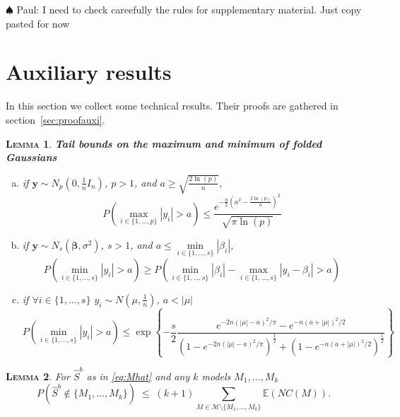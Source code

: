 \documentclass[aos]{imsart}
\theoremstyle{plain}
\newtheorem{lem}{\textsc{Lemma}}[section]
\newcommand{\paul}[1]{{\small{\color{green} \sf $\spadesuit$ Paul: #1}}}
\newcommand{\E}{\mathbb{E}}
\newcommand{\bs}{\boldsymbol}
\begin{document}
\begin{supplement}

\paul{I need to check careefully the rules for supplementary material. Just copy pasted for now}

 
 \section{Auxiliary results}\label{auxiliary}

In this section we collect some technical results. Their proofs are gathered in section~\ref{sec:proofauxi}. 

\begin{lem}\label{lemma:3tailbounds}\textbf{Tail bounds on the maximum and minimum of folded Gaussians} 
\begin{enumerate}[a)]
    \item if $\bs y\sim N_p\left(0,\frac{1}{n}I_n \right)$, $p>1$, and $a \geq \sqrt{\frac{2\ln(p)}{n}}$, $$P\left(\underset{i\in\{1,\ldots,p\}}{\max}|y_i|> a \right) \leq \frac{e^{-\frac{n}{2}\left(a^2-\frac{2\ln (p)}{n}\right)^{2}}}{\sqrt{\pi\ln (p)}}$$
    \item if $\bs y\sim N_s\left(\bs\beta,\sigma^2\right)$, $s>1$, and $a \leq \underset{i\in\{1,\ldots,s\}}{\min}|\beta_i|$,
        $$P\left(\underset{i\in\{1,\ldots,s\}}{\min}|y_i| > a\right) \geq P\left(\underset{i\in\{1,\ldots,s\}}{\min}|\beta_i|-\underset{i\in\{1,\ldots,s\}}{\max}|y_i-\beta_i| > a \right)$$
    \item if $\forall i\in\{1,\ldots,s\}$ $y_i\sim N\left(\mu,\frac{1}{n}\right)$, $a<|\mu|$
        $$P\left(\underset{i\in\{1,\ldots,s\}}{\min}|y_i| > a \right) \leq \exp\left\{-\frac{s}{2}\frac{e^{-2n(|\mu|-a)^2/\pi}-e^{-n(a+|\mu|)^2/2}}{\left(1-e^{-2n(|\mu|-a)^2/\pi}\right)^{\frac{1}{2}}+\left(1-e^{-n(a+|\mu|)^2/2}\right)^{\frac{1}{2}}}\right\} $$
\end{enumerate}
\end{lem}



\begin{lem}\label{lem:L0toL1convergencegen} For $\hat S^b$ as in \eqref{eq:Mhat} and any $k$ models $M_1,\ldots,M_k$
$$P(\hat{S}^b\not\in \{M_1,\ldots,M_k\})\;\leq\; (k+1) \sum_{M \in \mathcal{M}\setminus \{M_1,\ldots,M_k\}}\E\left( NC(M)\right).$$
\end{lem}


\end{supplement}
\end{document}
